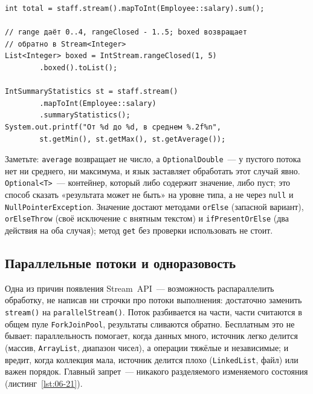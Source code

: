 \begin{listing}[H]
\begin{verbatim}
int total = staff.stream().mapToInt(Employee::salary).sum();

// range даёт 0..4, rangeClosed - 1..5; boxed возвращает
// обратно в Stream<Integer>
List<Integer> boxed = IntStream.rangeClosed(1, 5)
        .boxed().toList();

IntSummaryStatistics st = staff.stream()
        .mapToInt(Employee::salary)
        .summaryStatistics();
System.out.printf("От %d до %d, в среднем %.2f%n",
        st.getMin(), st.getMax(), st.getAverage());
\end{verbatim}
\caption{Примитивный поток и сводная статистика}
\label{lst:06-20}
\end{listing}

Заметьте: \texttt{average} возвращает не число, а \texttt{OptionalDouble}~---
у пустого потока нет ни среднего, ни максимума, и язык заставляет обработать
этот случай явно. \texttt{Optional<T>}~--- контейнер, который либо содержит
значение, либо пуст; это способ сказать «результата может не быть» на уровне
типа, а не через \texttt{null} и \texttt{NullPointerException}. Значение
достают методами \texttt{orElse} (запасной вариант), \texttt{orElseThrow}
(своё исключение с внятным текстом) и \texttt{ifPresentOrElse} (два действия
на оба случая); метод \texttt{get} без проверки использовать не стоит.

\subsection{Параллельные потоки и одноразовость}

Одна из причин появления Stream~API~--- возможность распараллелить обработку,
не написав ни строчки про потоки выполнения: достаточно заменить
\texttt{stream()} на \texttt{parallelStream()}. Поток разбивается на части,
части считаются в общем пуле \texttt{ForkJoinPool}, результаты сливаются
обратно. Бесплатным это не бывает: параллельность помогает, когда данных
много, источник легко делится (массив, \texttt{ArrayList}, диапазон чисел), а
операции тяжёлые и независимые; и вредит, когда коллекция мала, источник
делится плохо (\texttt{LinkedList}, файл) или важен порядок. Главный
запрет~--- никакого разделяемого изменяемого состояния
(листинг~\ref{lst:06-21}).

